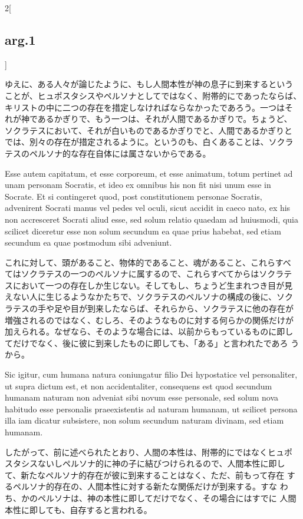 \documentclass[paper=a4paper,fontsize=10pt,jafontsize=9pt,titlepage]{jlreq}
\begin{document}
\begin{paracol}{2}[\subsection{arg.1}]
\switchcolumn

ゆえに、ある人々が論じたように、もし人間本性が神の息子に到来するという
ことが、ヒュポスタシスやペルソナとしてではなく、附帯的にであったならば、
キリストの中に二つの存在を措定しなければならなかったであろう。一つはそ
れが神であるかぎりで、もう一つは、それが人間であるかぎりで。ちょうど、
ソクラテスにおいて、それが白いものであるかぎりでと、人間であるかぎりと
では、別々の存在が措定されるように。というのも、白くあることは、ソクラ
テスのペルソナ的な存在自体には属さないからである。

\switchcolumn*

Esse autem capitatum, et esse corporeum, et esse animatum, totum
pertinet ad unam personam Socratis, et ideo ex omnibus his non fit
nisi unum esse in Socrate. Et si contingeret quod, post constitutionem
personae Socratis, advenirent Socrati manus vel pedes vel oculi, sicut
accidit in caeco nato, ex his non accresceret Socrati aliud esse, sed
solum relatio quaedam ad huiusmodi, quia scilicet diceretur esse non
solum secundum ea quae prius habebat, sed etiam secundum ea quae
postmodum sibi adveniunt.

\switchcolumn

これに対して、頭があること、物体的であること、魂があること、これらすべ
てはソクラテスの一つのペルソナに属するので、これらすべてからはソクラテ
スにおいて一つの存在しか生じない。そしてもし、ちょうど生まれつき目が見
えない人に生じるようなかたちで、ソクラテスのペルソナの構成の後に、ソク
ラテスの手や足や目が到来したならば、それらから、ソクラテスに他の存在が
増強されるのではなく、むしろ、そのようなものに対する何らかの関係だけが
加えられる。なぜなら、そのような場合には、以前からもっているものに即し
てだけでなく、後に彼に到来したものに即しても、「ある」と言われたであろ
うから。

\switchcolumn*

Sic igitur, cum humana natura coniungatur filio Dei hypostatice vel
personaliter, ut supra dictum est, et non accidentaliter, consequens
est quod secundum humanam naturam non adveniat sibi novum esse
personale, sed solum nova habitudo esse personalis praeexistentis ad
naturam humanam, ut scilicet persona illa iam dicatur subsistere, non
solum secundum naturam divinam, sed etiam humanam.

\switchcolumn

したがって、前に述べられたとおり、人間の本性は、附帯的にではなくヒュポ
 スタシスないしペルソナ的に神の子に結びつけられるので、人間本性に即し
 て、新たなペルソナ的存在が彼に到来することはなく、ただ、前もって存在
 するペルソナ的存在の、人間本性に対する新たな関係だけが到来する。すな
 わち、かのペルソナは、神の本性に即してだけでなく、その場合にはすでに
 人間本性に即しても、自存すると言われる。


\end{paracol}
\end{document}
